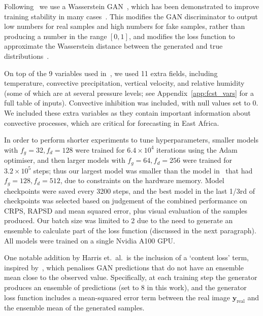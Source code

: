\documentclass{article}
\begin{document}
Following~\cite{harris_generative_2022} we use a Wasserstein GAN~\citep{arjovsky_wasserstein_2017}, which has been demonstrated to improve training stability in many cases~\citep{creswell_generative_2018}. This modifies the GAN discriminator to output low numbers for real samples and high numbers for fake samples, rather than producing a number in the range $[0,1]$, and modifies the loss function to approximate the Wasserstein distance between the generated and true distributions~\citep{gulrajani_improved_2017}.

 On top of the 9 variables used in~\cite{harris_generative_2022}, we used 11 extra fields, including temperature, convective precipitation, vertical velocity, and relative humidity (some of which are at several pressure levels; see Appendix~\ref{app:fcst_vars} for a full table of inputs). Convective inhibition was included, with null values set to 0. We included these extra variables as they contain important information about convective processes, which are critical for forecasting in East Africa. 

 In order to perform shorter experiments to tune hyperparameters, smaller models with $f_g=32, f_d=128$ were trained for $6.4\times 10^4$ iterations using the Adam optimiser, and then larger models with $f_g=64, f_d=256$ were trained for $3.2\times10^5$ steps; thus our largest model was smaller than the model in~\cite{harris_generative_2022} that had $f_g=128, f_d=512$, due to constraints on the hardware memory. Model checkpoints were saved every 3200 steps, and the best model in the last 1/3rd of checkpoints was selected based on judgement of the combined performance on CRPS, RAPSD and mean squared error, plus visual evaluation of the samples produced. Our batch size was limited to 2 due to the need to generate an ensemble to calculate part of the loss function (discussed in the next paragraph). All models were trained on a single Nvidia A100 GPU.

One notable addition by Harris et.~al.~is the inclusion of a `content loss' term, inspired by~\cite{ravuri_skilful_2021}, which penalises GAN predictions that do not have an ensemble mean close to the observed value. Specifically, at each training step the generator produces an ensemble of predictions (set to 8 in this work), and the generator loss function includes a mean-squared error term between the real image $\mathbf{y}_{\text{real}}$ and the ensemble mean of the generated samples.
\end{document}
